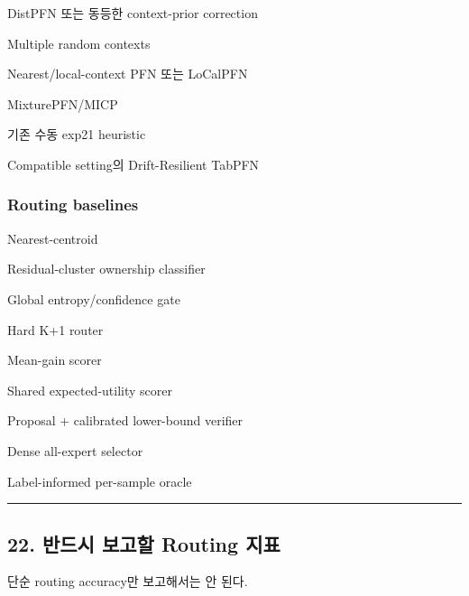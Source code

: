 \par\noindent \textbullet\enspace DistPFN 또는 동등한 context-prior correction


\par\noindent \textbullet\enspace Multiple random contexts


\par\noindent \textbullet\enspace Nearest/\allowbreak{}local-context PFN 또는 LoCalPFN


\par\noindent \textbullet\enspace MixturePFN/\allowbreak{}MICP


\par\noindent \textbullet\enspace 기존 수동 exp21 heuristic


\par\noindent \textbullet\enspace Compatible setting의 Drift-Resilient TabPFN


\subsubsection{Routing baselines}
\par\noindent \textbullet\enspace Nearest-centroid


\par\noindent \textbullet\enspace Residual-cluster ownership classifier


\par\noindent \textbullet\enspace Global entropy/\allowbreak{}confidence gate


\par\noindent \textbullet\enspace Hard K+\allowbreak{}1 router


\par\noindent \textbullet\enspace Mean-gain scorer


\par\noindent \textbullet\enspace Shared expected-utility scorer


\par\noindent \textbullet\enspace Proposal +\allowbreak{} calibrated lower-bound verifier


\par\noindent \textbullet\enspace Dense all-expert selector


\par\noindent \textbullet\enspace Label-informed per-sample oracle



\medskip\hrule\medskip
\subsection{22. 반드시 보고할 Routing 지표}
단순 routing accuracy만 보고해서는 안 된다.

